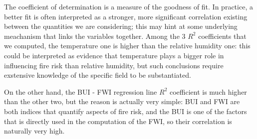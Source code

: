 \documentclass{article}
\begin{document}
The coefficient of determination is a measure of the goodness of fit. In practice, a better fit is often interpreted as a stronger, more significant correlation existing between the quantities we are considering; this may hint at some underlying meachanism that links the variables together. 
Among the 3 $R^2$ coefficients that we computed, the temperature one is higher than the relative humidity one: this could be interpreted as evidence that temperature plays a bigger role in influencing fire risk than relative humidity, but such conclusions require exstensive knowledge of the specific field to be substantiated.

On the other hand, the BUI - FWI regression line $R^2$ coefficient is much higher than the other two, but the reason is actually very simple: BUI and FWI are both indices that quantify aspects of fire risk, and the BUI is one of the factors that is directly used in the computation of the FWI, so their correlation is naturally very high.
\end{document}
